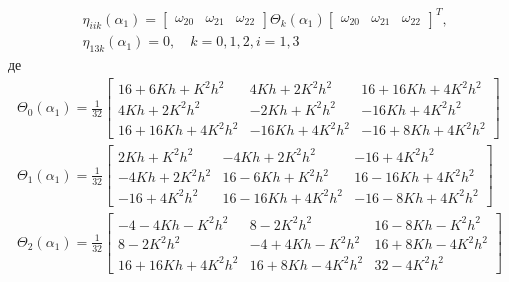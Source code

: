 \documentclass[10pt,a4paper]{article}
\numberwithin{figure}{section}
\numberwithin{equation}{section}
\begin{document}
\begin{equation}
\begin{aligned}
&\eta_{iik}\left(\alpha_1\right)=\left[\begin{array}{ccc}
\omega_{20} & \omega_{21} & \omega_{22}
\end{array} \right] \Theta_k\left(\alpha_1\right) \left[\begin{array}{ccc}
\omega_{20} & \omega_{21} & \omega_{22}
\end{array} \right]^T,\\
&\eta_{13k}\left(\alpha_1\right)=0, \quad k=0,1,2, i=1,3
\end{aligned}
\end{equation}
де
\begin{equation}\label{eq:sqt_strain_nl}
\begin{aligned}
\Theta_0\left(\alpha_1\right)=\frac{1}{32}
\left[
\begin{array}{ccc}
16+6Kh+K^2h^2 & 4Kh+2K^2h^2 & 16+16Kh+4K^2h^2 \\ 
4Kh+2K^2h^2 & -2Kh+K^2h^2 & -16Kh+4K^2h^2 \\ 
16+16Kh+4K^2h^2 & -16Kh+4K^2h^2 & -16+8Kh+4K^2h^2
\end{array}
\right]\\
\Theta_1\left(\alpha_1\right)=\frac{1}{32}
\left[
\begin{array}{ccc}
2Kh+K^2h^2 & -4Kh+2K^2h^2 & -16+4K^2h^2 \\ 
-4Kh+2K^2h^2 & 16-6Kh+K^2h^2 & 16-16Kh+4K^2h^2 \\ 
-16+4K^2h^2  & 16-16Kh+4K^2h^2 & -16-8Kh+4K^2h^2
\end{array}
\right]\\
\Theta_2\left(\alpha_1\right)=\frac{1}{32}
\left[
\begin{array}{ccc}
-4-4Kh-K^2h^2 & 8-2K^2h^2 & 16-8Kh-K^2h^2 \\ 
8-2K^2h^2 & -4+4Kh-K^2h^2 & 16+8Kh-4K^2h^2 \\ 
16+16Kh+4K^2h^2 & 16+8Kh-4K^2h^2 & 32-4K^2h^2
\end{array}
\right]\\
\end{aligned}
\end{equation}
\end{document}
